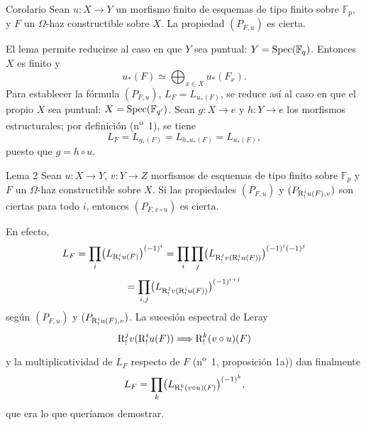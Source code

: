 \begin{statement}{Corolario}
Sean $u:X\to Y$ un morfismo finito de esquemas de tipo finito sobre $\mathbb F_p$, y $F$ un $\Omega$-haz constructible sobre $X$. La propiedad $(P_{F,u})$ es cierta.
\end{statement}

El lema permite reducirse al caso en que $Y$ sea puntual: $Y=\operatorname{Spec}(\mathbb F_q)$. Entonces $X$ es finito y
\[
u_*(F)\simeq \bigoplus_{x\in X}u_*(F_x).
\]
Para establecer la fórmula $(P_{F,u})$, $L_F=L_{u_*(F)}$, se reduce así al caso en que el propio $X$ sea puntual: $X=\operatorname{Spec}(\mathbb F_{q'})$. Sean $g:X\to e$ y $h:Y\to e$ los morfismos estructurales; por definición (n\textsuperscript{o}~1), se tiene
\[
L_F=L_{g_*(F)}=L_{h_*u_*(F)}=L_{u_*(F)},
\]
puesto que $g=h\circ u$.

\begin{statement}{Lema 2}
Sean $u:X\to Y$, $v:Y\to Z$ morfismos de esquemas de tipo finito sobre $\mathbb F_p$ y $F$ un $\Omega$-haz constructible sobre $X$. Si las propiedades $(P_{F,u})$ y $(P_{\mathrm{R}^i_!u(F),v})$ son ciertas para todo $i$, entonces $(P_{F,v\circ u})$ es cierta.
\end{statement}

En efecto,
\[
L_F=\prod_i\bigl(L_{\mathrm{R}^i_!u(F)}\bigr)^{(-1)^i}
 =\prod_i\prod_j\bigl(L_{\mathrm{R}^j_!v(\mathrm{R}^i_!u(F))}\bigr)^{(-1)^i(-1)^j}
\]
\[
=\prod_{i,j}\bigl(L_{\mathrm{R}^j_!v(\mathrm{R}^i_!u(F))}\bigr)^{(-1)^{i+j}}
\]
según $(P_{F,u})$ y $(P_{\mathrm{R}^i_!u(F),v})$. La sucesión espectral de Leray
\[
\mathrm{R}^j_!v(\mathrm{R}^i_!u(F))\Longrightarrow \mathrm{R}^k_!(v\circ u)(F)
\]
y la multiplicatividad de $L_F$ respecto de $F$ (n\textsuperscript{o}~1, proposición 1a)) dan finalmente
\[
L_F=\prod_k\bigl(L_{\mathrm{R}^k_!(v\circ u)(F)}\bigr)^{(-1)^k},
\]
que era lo que queríamos demostrar.
